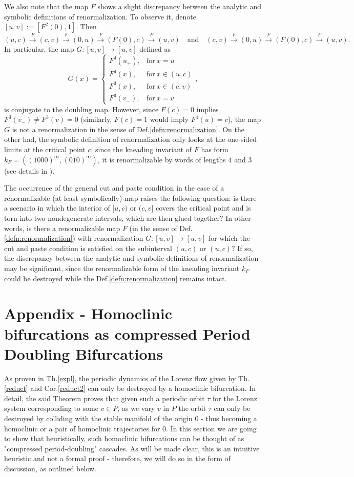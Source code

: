 \documentclass[10pt,reqno]{amsart}
\theoremstyle{plain}
\theoremstyle{assumption}
\theoremstyle{notation}
\theoremstyle{claim}
\theoremstyle{conj}
\theoremstyle{theorem}
\theoremstyle{proposition}
\theoremstyle{corollary}
\begin{document}
We also note that the map $F$ shows a slight discrepancy between the analytic and symbolic definitions of renormalization. To observe it, denote $[u,v]:=[F^2(0),1]$. Then
$$
	(u,c)\xrightarrow{\ F\ }(c,v)\xrightarrow{\ F\ }(0,u)\xrightarrow{\ F\ }(F(0),c)\xrightarrow{\ F\ }(u,v)
	\quad\text{and}\quad
	(c,v)\xrightarrow{\ F\ }(0,u)\xrightarrow{\ F\ }(F(0),c)\xrightarrow{\ F\ }(u,v).
	$$
In particular, the map $G\colon[u,v]\to[u,v]$ defined as
$$
G(x)=
	\begin{cases}
F^4(u_{+}), &\text{for}\ x=u\\
	F^4(x), &\text{for}\ x\in(u,c)\\
	F^3(x), &\text{for}\ x\in (c,v)\\
	F^3(v_{-}), &\text{for}\ x=v
\end{cases},
$$
is conjugate to the doubling map. However, since $F(c)=0$ implies $F^3(v_-)\neq F^3(v)=0$ (similarly, $F(c)=1$ would imply $F^4(u)=c$), the map $G$ is not a renormalization in the sense of Def.\ref{defn:renormalization}. On the other had, the symbolic definition of renormalization only looks at the one-sided limits at the critical point $c$: since the kneading invariant of $F$ has form $k_F=((1000)^\infty,(010)^\infty)$, it is renormalizable by words of lengths $4$ and $3$ (see details in \cite{ChO}). 

The occurrence of the general cut and paste condition in the case of a renormalizable (at least symbolically) map raises the following question: is there a scenario in which the interior of $[u,c)$ or $(c,v]$ covers the critical point and is torn into two nondegenerate intervals, which are then glued together? In other words, is there a renormalizable map $F$ (in the sense of Def.\ref{defn:renormalization}) with renormalization $G\colon[u,v]\to[u,v]$ for which the cut and paste condition is satisfied on the subinterval $(u,c)$ or $(u,c)$? If so, the discrepancy between the analytic and symbolic definitions of renormalization may be significant, since the renormalizable form of the kneading invariant $k_F$ could be destroyed while the Def.\ref{defn:renormalization} remains intact.


\section{Appendix - Homoclinic bifurcations as compressed Period Doubling Bifurcations}
\label{compressing}

As proven in Th.\ref{expl}, the periodic dynamics of the Lorenz flow given by Th.\ref{reduct} and Cor.\ref{reduct2} can only be destroyed by a homoclinic bifurcation. In detail, the said Theorem proves that given such a periodic orbit $\tau$ for the Lorenz system corresponding to some $v\in P$, as we vary $v$ in $P$ the orbit $\tau$ can only be destroyed by colliding with the stable manifold of the origin $0$ - thus becoming a homoclinic or a pair of homoclinic trajectories for $0$. In this section we are going to show that heuristically, such homoclinic bifurcations can be thought of as "compressed period-doubling" cascades. As will be made clear, this is an intuitive heuristic and not a formal proof - therefore, we will do so in the form of discussion, as outlined below. \\
\end{document}
